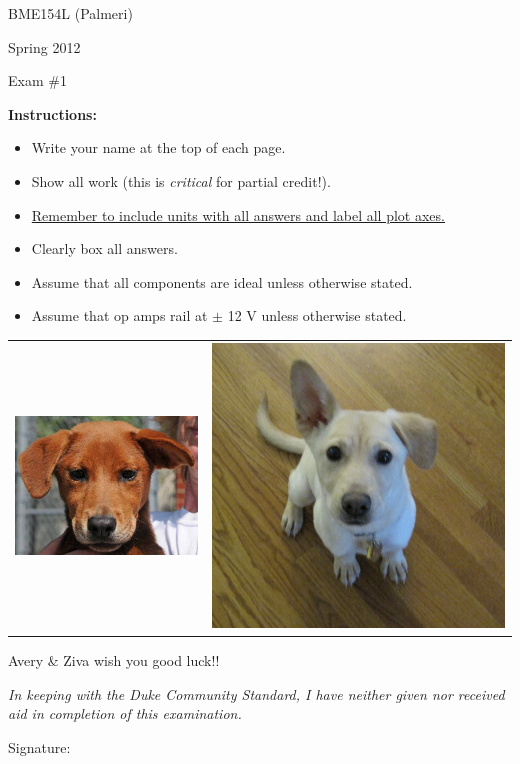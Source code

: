 

\vspace*{0.5in}

\centerline{\LARGE BME154L (Palmeri)}
\vspace*{0.25in}
\centerline{\LARGE Spring 2012}
\vspace*{0.25in}
\centerline{\LARGE Exam \#1}
\vspace*{0.25in}

{\bf Instructions:} 
\begin{itemize}
\item Write your name at the top of each page.
\item Show all work (this is {\it critical} for partial credit!).
\item \underline{Remember to include units with all answers and label all plot axes.}
\item Clearly box all answers.
\item Assume that all components are ideal unless otherwise stated.
\item Assume that op amps rail at $\pm$ 12 V unless otherwise stated.
\end{itemize}

\begin{center}
\begin{tabular}{cc}
\includegraphics[width=0.39\linewidth]{avery.jpg} &
\includegraphics[width=0.3\linewidth]{ziva.jpg} \\
\end{tabular}

Avery \& Ziva wish you good luck!!
\end{center}


\emph{In keeping with the Duke Community Standard, I have neither given nor received aid in completion of this examination.}

\vspace*{0.5in}

Signature:\underline{\hspace*{3.0in}}
